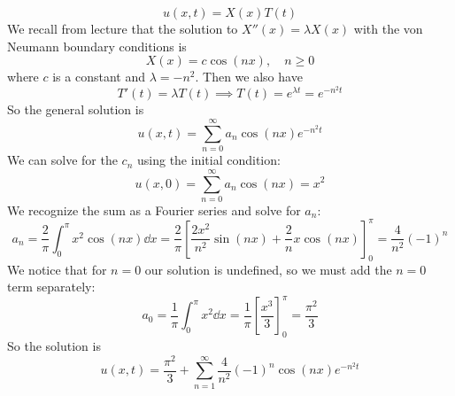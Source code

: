 \documentclass[plain]{pset}
\begin{document}
\begin{solution}
    \[u(x, t) = X(x)T(t)\]
    We recall from lecture that the solution to \(X''(x) = \lambda X(x)\) with the von Neumann boundary conditions is
    \[
        X(x) = c \cos(nx), \quad n \geq 0
    \]
    where \(c\) is a constant and \(\lambda = -n^2\). Then we also have
    \[T'(t) = \lambda T(t) \implies T(t) = e^{\lambda t} = e^{-n^2t}\]
    So the general solution is
    \[u(x, t) = \sum_{n=0}^\infty a_n \cos(nx) e^{-n^2t}\]
    We can solve for the \(c_n\) using the initial condition:
    \[u(x, 0) = \sum_{n=0}^\infty a_n \cos(nx) = x^2\]
    We recognize the sum as a Fourier series and solve for \(a_n\):
    \[a_n = \frac{2}{\pi} \int_0^\pi x^2 \cos(nx) \dd x = \frac{2}{\pi} \left[\frac{2x^2}{n^2} \sin(nx) + \frac{2}{n}x\cos(nx)\right]_0^\pi = \frac{4}{n^2}(-1)^n\]
    We notice that for \(n = 0\) our solution is undefined, so we must add the \(n = 0\) term separately:
    \[a_0 = \frac{1}{\pi} \int_0^\pi x^2 \dd x = \frac{1}{\pi} \left[\frac{x^3}{3}\right]_0^\pi = \frac{\pi^2}{3}\]
    So the solution is
    \[u(x, t) = \frac{\pi^2}{3} + \sum_{n=1}^\infty \frac{4}{n^2}(-1)^n \cos(nx) e^{-n^2t}\]
\end{solution}

\pagebreak
\end{document}
